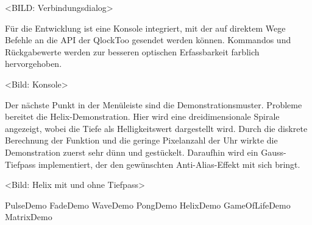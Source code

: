 <BILD: Verbindungsdialog>

Für die Entwicklung ist eine Konsole integriert, mit der auf direktem Wege Befehle an die API der QlockToo gesendet werden können. Kommandos und Rückgabewerte werden zur besseren optischen Erfassbarkeit farblich hervorgehoben.

<Bild: Konsole>

Der nächste Punkt in der Menüleiste sind die Demonstrationsmuster.
Probleme bereitet die Helix-Demonstration. Hier wird eine dreidimensionale Spirale angezeigt, wobei die Tiefe als Helligkeitswert dargestellt wird.
Durch die diskrete Berechnung der Funktion und die geringe Pixelanzahl der Uhr wirkte die Demonstration zuerst sehr dünn und gestückelt. Daraufhin wird ein Gauss-Tiefpass implementiert, der den gewünschten Anti-Alias-Effekt mit sich bringt.

<Bild: Helix mit und ohne Tiefpass>

PulseDemo
FadeDemo
WaveDemo
PongDemo
HelixDemo
GameOfLifeDemo
MatrixDemo

